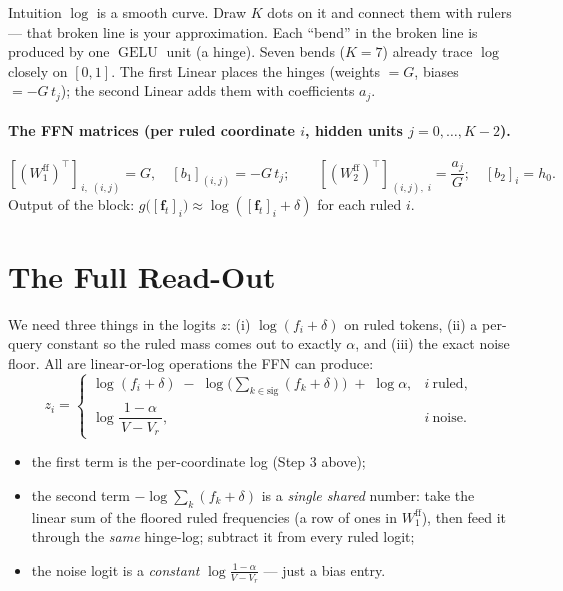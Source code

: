 \documentclass[11pt]{article}
\newcommand{\T}{^{\!\top}}
\newcommand{\fvec}{\mathbf{f}}
\newcommand{\gelu}{\operatorname{GELU}}
\begin{document}
\begin{keybox}{Intuition}
$\log$ is a smooth curve. Draw $K$ dots on it and connect them with rulers --- that broken line is your
approximation. Each ``bend'' in the broken line is produced by one $\gelu$ unit (a hinge). Seven bends
($K=7$) already trace $\log$ closely on $[0,1]$. The first Linear places the hinges (weights $=G$, biases
$=-G\,t_j$); the second Linear adds them with coefficients $a_j$.
\end{keybox}

\paragraph{The FFN matrices (per ruled coordinate $i$, hidden units $j=0,\dots,K-2$).}
$$
[(W_1^{\mathrm{ff}})\T]_{\,i,\;(i,j)}=G,\quad [b_1]_{(i,j)}=-G\,t_j;\qquad
[(W_2^{\mathrm{ff}})\T]_{\,(i,j),\;i}=\frac{a_j}{G};\quad [b_2]_i=h_0 .
$$
Output of the block: $g\big([\fvec_t]_i\big)\approx\log([\fvec_t]_i+\delta)$ for each ruled $i$.

\section{The Full Read-Out}
We need three things in the logits $z$: (i) $\log(f_i+\delta)$ on ruled tokens, (ii) a per-query constant
so the ruled mass comes out to exactly $\alpha$, and (iii) the exact noise floor. All are linear-or-log
operations the FFN can produce:
$$
z_i=
\begin{cases}
\log(f_i+\delta)\;-\;\log\!\big(\textstyle\sum_{k\in\text{sig}}(f_k+\delta)\big)\;+\;\log\alpha, & i\ \text{ruled},\\[4pt]
\log\!\dfrac{1-\alpha}{\,V-V_r\,}, & i\ \text{noise}.
\end{cases}
$$
\begin{itemize}[nosep,leftmargin=1.4em]
\item the first term is the per-coordinate log (Step 3 above);
\item the second term $-\log\sum_k(f_k+\delta)$ is a \emph{single shared} number: take the linear sum of
the floored ruled frequencies (a row of ones in $W_1^{\mathrm{ff}}$), then feed it through the \emph{same}
hinge-log; subtract it from every ruled logit;
\item the noise logit is a \emph{constant} $\log\frac{1-\alpha}{V-V_r}$ --- just a bias entry.
\end{itemize}
\end{document}
